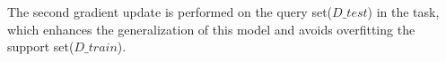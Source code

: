 The second gradient update is performed on the query set($D\_test$) in the task, which enhances the generalization of this model and avoids overfitting the support set($D\_train$).

